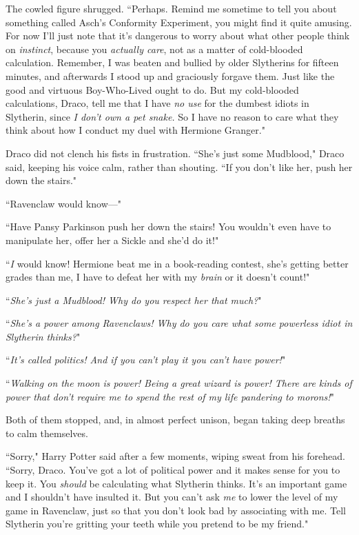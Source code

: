 The cowled figure shrugged. ``Perhaps. Remind me sometime to tell you about something called Asch's Conformity Experiment, you might find it quite amusing. For now I'll just note that it's dangerous to worry about what other people think on \emph{instinct}, because you \emph{actually care}, not as a matter of cold-blooded calculation. Remember, I was beaten and bullied by older Slytherins for fifteen minutes, and afterwards I stood up and graciously forgave them. Just like the good and virtuous Boy-Who-Lived ought to do. But my cold-blooded calculations, Draco, tell me that I have \emph{no use} for the dumbest idiots in Slytherin, since \emph{I don't own a pet snake.} So I have no reason to care what they think about how I conduct my duel with Hermione Granger."

Draco did not clench his fists in frustration. ``She's just some Mudblood," Draco said, keeping his voice calm, rather than shouting. ``If you don't like her, push her down the stairs."

``Ravenclaw would know—"

``Have Pansy Parkinson push her down the stairs! You wouldn't even have to manipulate her, offer her a Sickle and she'd do it!"

``\emph{I} would know! Hermione beat me in a book-reading contest, she's getting better grades than me, I have to defeat her with my \emph{brain} or it doesn't count!"

``\emph{She's just a Mudblood! Why do you respect her that much?}"

``\emph{She's a power among Ravenclaws! Why do you care what some powerless idiot in Slytherin thinks?}"

``\emph{It's called politics! And if you can't play it you can't have power!}"

``\emph{Walking on the moon is power! Being a great wizard is power! There are kinds of power that don't require me to spend the rest of my life pandering to morons!}"

Both of them stopped, and, in almost perfect unison, began taking deep breaths to calm themselves.

``Sorry," Harry Potter said after a few moments, wiping sweat from his forehead. ``Sorry, Draco. You've got a lot of political power and it makes sense for you to keep it. You \emph{should} be calculating what Slytherin thinks. It's an important game and I shouldn't have insulted it. But you can't ask \emph{me} to lower the level of my game in Ravenclaw, just so that you don't look bad by associating with me. Tell Slytherin you're gritting your teeth while you pretend to be my friend."

